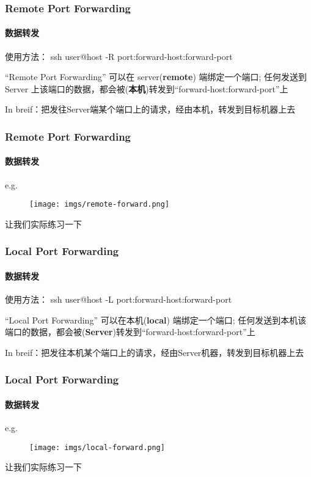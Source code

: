 \begin{frame}[fragile]
  \frametitle{Remote Port Forwarding}
  \framesubtitle{数据转发}

  使用方法： \vspace{\baselineskip}
  ssh user@host -R port:forward-host:forward-port
  \vspace{\baselineskip}
  
  ``Remote Port Forwarding'' 可以在 server(\textbf{remote}) 端绑定一个端口; 任何发送到Server 上该端口的数据，都会被(\textbf{本机})转发到``forward-host:forward-port''上

  \pause
  \vspace{\baselineskip}
  In breif：把发往Server端某个端口上的请求，经由本机，转发到目标机器上去

\end{frame}

\begin{frame}[fragile]
  \frametitle{Remote Port Forwarding}
  \framesubtitle{数据转发}

  e.g. \pause

  \begin{figure}[htbp]
    \centering
    \texttt{[image: imgs/remote-forward.png]}
  \end{figure}

  \pause

  让我们实际练习一下
  
\end{frame}


\begin{frame}[fragile]
  \frametitle{Local Port Forwarding}
  \framesubtitle{数据转发}

  使用方法： \vspace{\baselineskip}
  ssh user@host -L port:forward-host:forward-port
  \vspace{\baselineskip}
  
  ``Local Port Forwarding'' 可以在本机(\textbf{local}) 端绑定一个端口; 任何发送到本机该端口的数据，都会被(\textbf{Server})转发到``forward-host:forward-port''上

  \pause
  \vspace{\baselineskip}
  In breif：把发往本机某个端口上的请求，经由Server机器，转发到目标机器上去

\end{frame}

\begin{frame}[fragile]
  \frametitle{Local Port Forwarding}
  \framesubtitle{数据转发}

  e.g. \pause

  \begin{figure}[htbp]
    \centering
    \texttt{[image: imgs/local-forward.png]}
  \end{figure}

  \pause

  让我们实际练习一下
  
\end{frame}

